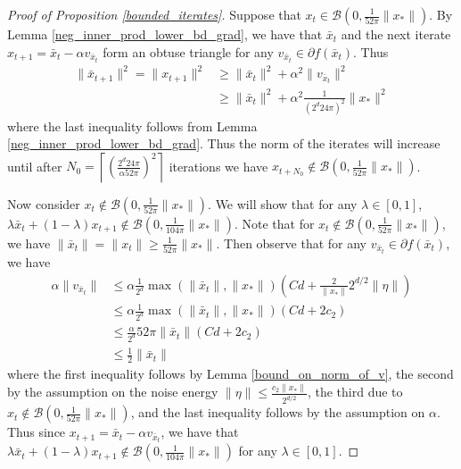 \documentclass[11pt]{article}
\newcommand{\al}{\alpha}
\theoremstyle{remark}
\begin{document}
\begin{proof}[Proof of Proposition \ref{bounded_iterates}]
Suppose that $x_t \in \mathcal{B}(0,\frac{1}{52\pi}\|x_*\|)$. By Lemma \ref{neg_inner_prod_lower_bd_grad}, we have that $\bar{x}_t$ and the next iterate $x_{t+1} = \bar{x}_t - \al v_{\bar{x}_t}$ form an obtuse triangle for any $v_{\bar{x}_t} \in \partial f(\bar{x}_t)$. Thus \begin{align*}
   \|\bar{x}_{t+1}\|^2 = \|x_{t+1}\|^2 & \geqslant \|\bar{x}_t\|^2 + \al^2 \|v_{\bar{x}_t}\|^2 \\
    & \geqslant \|\bar{x}_t\|^2 + \al^2 \frac{1}{(2^d24\pi)^2}\|x_*\|^2
\end{align*} where the last inequality follows from Lemma \ref{neg_inner_prod_lower_bd_grad}. Thus the norm of the iterates will increase until after $N_0 = \left\lceil\left(\frac{2^d24\pi}{\al 52\pi}\right)^2\right\rceil$ iterations we have $x_{t+N_0} \notin \mathcal{B}(0,\frac{1}{52\pi}\|x_*\|)$. 

Now consider $x_t \notin \mathcal{B}(0, \frac{1}{52\pi}\|x_*\|)$. We will show that for any $\lambda \in [0,1]$, $\lambda \bar{x}_t + (1-\lambda)x_{t+1} \notin \mathcal{B}(0, \frac{1}{104\pi}\|x_*\|)$. Note that for $x_t \notin \mathcal{B}(0, \frac{1}{52\pi}\|x_*\|)$, we have $\|\bar{x}_t\| = \|x_t\| \geqslant \frac{1}{52\pi}\|x_*\|$. Then observe that for any $v_{\bar{x}_t} \in \partial f(\bar{x}_t)$, we have \begin{align}
    \al \|v_{\bar{x}_t}\| & \leqslant \al \frac{1}{2^d}\max(\|\bar{x}_t\|,\|x_*\|)\left(Cd + \frac{2}{\|x_*\|}2^{d/2}\|\eta\|\right) \nonumber \\
    & \leqslant \al \frac{1}{2^d}\max(\|\bar{x}_t\|,\|x_*\|)\left(Cd + 2c_2\right) \nonumber \\
    & \leqslant \frac{\al}{2^d}52\pi\|\bar{x}_t\|\left(Cd + 2c_2\right) \nonumber \\
    & \leqslant \frac{1}{2}\|\bar{x}_t\| \nonumber
\end{align} where the first inequality follows by Lemma \ref{bound_on_norm_of_v}, the second by the assumption on the noise energy $\|\eta\| \leqslant \frac{c_2\|x_*\|}{2^{d/2}}$, the third due to $x_t \notin \mathcal{B}(0,\frac{1}{52\pi}\|x_*\|)$, and the last inequality follows by the assumption on $\al$. Thus since $x_{t+1} = \bar{x}_t - \al v_{\bar{x}_t}$, we have that $\lambda \bar{x}_t + (1-\lambda) x_{t+1} \notin \mathcal{B}(0,\frac{1}{104\pi}\|x_*\|)$ for any $\lambda \in [0,1].$
\end{proof}
\end{document}
